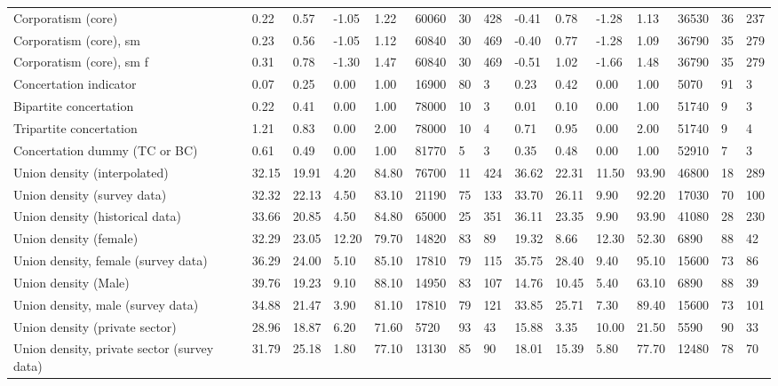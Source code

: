 \begin{longtable}{lllllllllllllll}
Corporatism (core) & 0.22 & 0.57 & -1.05 & 1.22 & 60060 & 30 & 428 & -0.41 & 0.78 & -1.28 & 1.13 & 36530 & 36 & 237\\
\addlinespace
Corporatism (core), sm & 0.23 & 0.56 & -1.05 & 1.12 & 60840 & 30 & 469 & -0.40 & 0.77 & -1.28 & 1.09 & 36790 & 35 & 279\\
Corporatism (core), sm f & 0.31 & 0.78 & -1.30 & 1.47 & 60840 & 30 & 469 & -0.51 & 1.02 & -1.66 & 1.48 & 36790 & 35 & 279\\
Concertation indicator & 0.07 & 0.25 & 0.00 & 1.00 & 16900 & 80 & 3 & 0.23 & 0.42 & 0.00 & 1.00 & 5070 & 91 & 3\\
Bipartite concertation & 0.22 & 0.41 & 0.00 & 1.00 & 78000 & 10 & 3 & 0.01 & 0.10 & 0.00 & 1.00 & 51740 & 9 & 3\\
Tripartite concertation & 1.21 & 0.83 & 0.00 & 2.00 & 78000 & 10 & 4 & 0.71 & 0.95 & 0.00 & 2.00 & 51740 & 9 & 4\\
\addlinespace
Concertation dummy (TC or BC) & 0.61 & 0.49 & 0.00 & 1.00 & 81770 & 5 & 3 & 0.35 & 0.48 & 0.00 & 1.00 & 52910 & 7 & 3\\
Union density (interpolated) & 32.15 & 19.91 & 4.20 & 84.80 & 76700 & 11 & 424 & 36.62 & 22.31 & 11.50 & 93.90 & 46800 & 18 & 289\\
Union density (survey data) & 32.32 & 22.13 & 4.50 & 83.10 & 21190 & 75 & 133 & 33.70 & 26.11 & 9.90 & 92.20 & 17030 & 70 & 100\\
Union density (historical data) & 33.66 & 20.85 & 4.50 & 84.80 & 65000 & 25 & 351 & 36.11 & 23.35 & 9.90 & 93.90 & 41080 & 28 & 230\\
Union density (female) & 32.29 & 23.05 & 12.20 & 79.70 & 14820 & 83 & 89 & 19.32 & 8.66 & 12.30 & 52.30 & 6890 & 88 & 42\\
\addlinespace
Union density, female (survey data) & 36.29 & 24.00 & 5.10 & 85.10 & 17810 & 79 & 115 & 35.75 & 28.40 & 9.40 & 95.10 & 15600 & 73 & 86\\
Union density (Male) & 39.76 & 19.23 & 9.10 & 88.10 & 14950 & 83 & 107 & 14.76 & 10.45 & 5.40 & 63.10 & 6890 & 88 & 39\\
Union density, male (survey data) & 34.88 & 21.47 & 3.90 & 81.10 & 17810 & 79 & 121 & 33.85 & 25.71 & 7.30 & 89.40 & 15600 & 73 & 101\\
Union density (private sector) & 28.96 & 18.87 & 6.20 & 71.60 & 5720 & 93 & 43 & 15.88 & 3.35 & 10.00 & 21.50 & 5590 & 90 & 33\\
Union density, private sector (survey data) & 31.79 & 25.18 & 1.80 & 77.10 & 13130 & 85 & 90 & 18.01 & 15.39 & 5.80 & 77.70 & 12480 & 78 & 70\\

\end{longtable}
